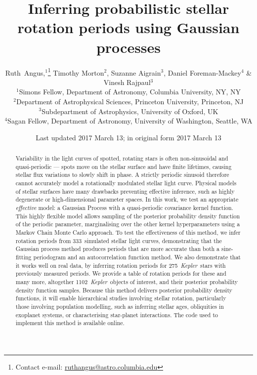 \documentclass[a4paper,fleqn,usenatbib,useAMS]{mnras}
\title[GP rotation periods]{Inferring probabilistic stellar rotation periods
using Gaussian processes}
\author[R.~Angus \emph{et al.}]{
    Ruth~Angus,$^1$\thanks{Contact e-mail:
\href{mailto:ruthangus@astro.columbia.edu}{ruthangus@astro.columbia.edu}}
    Timothy Morton$^2$,
    Suzanne Aigrain$^3$,
    Daniel Foreman-Mackey$^4$
    \newauthor
    \& Vinesh Rajpaul$^3$
    \\
    $^1$Simons Fellow, Department of Astronomy, Columbia University, NY, NY \\
    $^2$Department of Astrophysical Sciences, Princeton University,
    Princeton, NJ \\
    $^3$Subdepartment of Astrophysics, University of Oxford, UK \\
    $^4$Sagan Fellow, Department of Astronomy, University of Washington,
    Seattle, WA}
\date{Last updated 2017 March 13; in original form 2017 March 13}
\newcommand{\response}[1]{{#1}}
\newcommand{\Kepler}{{\it Kepler}}
\newcommand{\LSST}{{\it LSST}}
\newcommand{\nkoi}{1102}
\newcommand{\naigrain}{333}
\newcommand{\nkoimcq}{275}
\begin{document}
\label{firstpage}
\pagerange{\pageref{firstpage}--\pageref{lastpage}}
\maketitle

\begin{abstract}
Variability in the light curves of spotted, rotating stars is often
    non-sinusoidal and quasi-periodic --- spots move on the stellar surface
    and have finite lifetimes, causing stellar flux variations to slowly shift
    in phase.
A strictly periodic sinusoid therefore cannot accurately model a rotationally
    modulated stellar light curve.
Physical models of stellar surfaces have many drawbacks preventing effective
    inference, such as highly degenerate or high-dimensional parameter spaces.
In this work, we test an appropriate {\it effective} model: a Gaussian
    Process with a quasi-periodic covariance kernel function.
This highly flexible model allows sampling of the posterior probability
    density function of the periodic parameter, marginalising over the
    other kernel hyperparameters using a Markov Chain Monte Carlo approach.
To test the effectiveness of this method, we infer rotation periods from
    \naigrain\ simulated stellar light curves, demonstrating that the Gaussian
    process method produces periods that are more accurate than both
    a sine-fitting periodogram and an autocorrelation function method.
We also demonstrate that it works well on real data, by inferring
    rotation periods for \nkoimcq\ \Kepler\ stars with previously measured
    periods.
    \response{We provide a table of rotation periods for these and many
    more, altogether \nkoi\ \Kepler\ objects of interest, and their posterior
    probability density function samples.}
Because this method delivers posterior probability density functions, it will
    enable hierarchical studies involving stellar rotation, particularly those
    involving population modelling, such as inferring stellar ages,
    obliquities in exoplanet systems, or characterising star-planet
    interactions.
    The code used to implement this method is available online.

\end{abstract}
\end{document}
